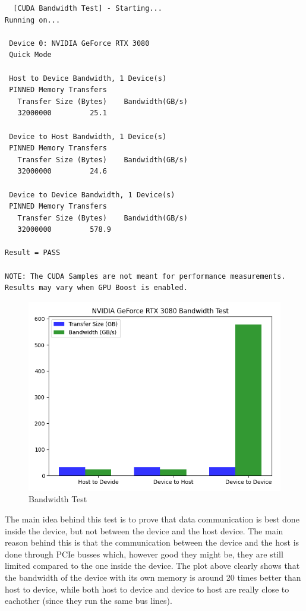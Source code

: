 \documentclass[english]{exam}
\begin{document}
\begin{lstlisting}
  [CUDA Bandwidth Test] - Starting...
Running on...

 Device 0: NVIDIA GeForce RTX 3080
 Quick Mode

 Host to Device Bandwidth, 1 Device(s)
 PINNED Memory Transfers
   Transfer Size (Bytes)	Bandwidth(GB/s)
   32000000			25.1

 Device to Host Bandwidth, 1 Device(s)
 PINNED Memory Transfers
   Transfer Size (Bytes)	Bandwidth(GB/s)
   32000000			24.6

 Device to Device Bandwidth, 1 Device(s)
 PINNED Memory Transfers
   Transfer Size (Bytes)	Bandwidth(GB/s)
   32000000			578.9

Result = PASS

NOTE: The CUDA Samples are not meant for performance measurements. Results may vary when GPU Boost is enabled.

\end{lstlisting}

\begin{figure}[h]
\centerline{\includegraphics[scale=0.5]{plt1.png}}
\caption{Bandwidth Test}
\label{fig}
\end{figure}

\noindent
The main idea behind this test is to prove that data communication is best done inside the device, but not between the device and the host device. The main reason behind this is that the communication between the device and the host is done through PCIe busses which, however good they might be, they are still limited compared to the one inside the device. The plot above clearly shows that the bandwidth of the device with its own memory is around 20 times better than host to device, while both host to device and device to host are really close to eachother (since they run the same bus lines).
\end{document}
